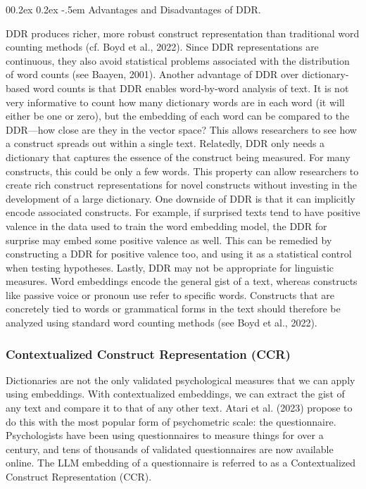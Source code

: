 \documentclass[
  man,
  floatsintext,
  longtable,
  nolmodern,
  notxfonts,
  notimes,
  colorlinks=true,linkcolor=blue,citecolor=blue,urlcolor=blue]{apa7}
\makeatletter
\renewcommand{\paragraph}{\@startsection{paragraph}{4}{\parindent}%
	{0\baselineskip \@plus 0.2ex \@minus 0.2ex}%
	{-.5em}%
	{\normalfont\normalsize\bfseries\typesectitle}}
\makeatother
\begin{document}
\paragraph{Advantages and Disadvantages of
DDR.}\label{advantages-and-disadvantages-of-ddr}

DDR produces richer, more robust construct representation than
traditional word counting methods (cf. Boyd et al., 2022). Since DDR
representations are continuous, they also avoid statistical problems
associated with the distribution of word counts (see Baayen, 2001).
Another advantage of DDR over dictionary-based word counts is that DDR
enables word-by-word analysis of text. It is not very informative to
count how many dictionary words are in each word (it will either be one
or zero), but the embedding of each word can be compared to the
DDR---how close are they in the vector space? This allows researchers to
see how a construct spreads out within a single text. Relatedly, DDR
only needs a dictionary that captures the essence of the construct being
measured. For many constructs, this could be only a few words. This
property can allow researchers to create rich construct representations
for novel constructs without investing in the development of a large
dictionary. One downside of DDR is that it can implicitly encode
associated constructs. For example, if surprised texts tend to have
positive valence in the data used to train the word embedding model, the
DDR for surprise may embed some positive valence as well. This can be
remedied by constructing a DDR for positive valence too, and using it as
a statistical control when testing hypotheses. Lastly, DDR may not be
appropriate for linguistic measures. Word embeddings encode the general
gist of a text, whereas constructs like passive voice or pronoun use
refer to specific words. Constructs that are concretely tied to words or
grammatical forms in the text should therefore be analyzed using
standard word counting methods (see Boyd et al., 2022).

\subsubsection{Contextualized Construct Representation
(CCR)}\label{contextualized-construct-representation-ccr}

Dictionaries are not the only validated psychological measures that we
can apply using embeddings. With contextualized embeddings, we can
extract the gist of any text and compare it to that of any other text.
Atari et al. (2023) propose to do this with the most popular form of
psychometric scale: the questionnaire. Psychologists have been using
questionnaires to measure things for over a century, and tens of
thousands of validated questionnaires are now available online. The LLM
embedding of a questionnaire is referred to as a Contextualized
Construct Representation (CCR).
\end{document}
